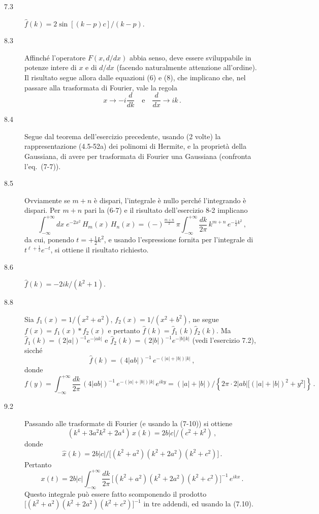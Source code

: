 \documentclass[11pt, a4paper]{book}
\numberwithin{equation}{section}
\begin{document}
\begin{description}
\item[7.3] $\hat{f}(k) = 2\sin[(k-p)c]/(k-p)$.

\item[8.3] Affinché l'operatore $F(x,d/dx)$ abbia senso, deve essere sviluppabile in potenze intere di $x$ e di $d/dx$ (facendo naturalmente attenzione all'ordine). Il risultato segue allora dalle equazioni (6) e (8), che implicano che, nel passare alla trasformata di Fourier, vale la regola
\[
  x\to -i\frac{d}{dk}\quad\text{e}\quad\frac{d}{dx}\to ik\,.
\]

\item[8.4] Segue dal teorema dell'esercizio precedente, usando (2 volte) la rappresentazione (4.5-52a) dei polinomi di Hermite, e la proprietà della Gaussiana, di avere per trasformata di Fourier una Gaussiana (confronta l'eq.\ (7-7)).

\item[8.5] Ovviamente se $m+n$ è dispari, l'integrale è nullo perché l'integrando è dispari. Per $m+n$ pari la (6-7) e il risultato dell'esercizio 8-2 implicano
\[
  \int_{-\infty}^{+\infty} dx\;e^{-2x^2}\,H_m(x)\,H_n(x)
  = (-)^{\frac{m+n}{2}}\,\pi\int_{-\infty}^{+\infty}\frac{dk}{2\pi}\,k^{m+n}\,e^{-\frac{1}{2}k^2}\,,
\]
da cui, ponendo $t=+\frac{1}{2}k^2$, e usando l'espressione fornita per l'integrale di $t^{\ell+\frac{1}{2}}e^{-t}$, si ottiene il risultato richiesto.

\item[8.6] $\hat{f}(k) = -2ik/(k^2+1)$.

\item[8.8] Sia $f_1(x)=1/(x^2+a^2)$, $f_2(x)=1/(x^2+b^2)$, ne segue $f(x)=f_1(x)*f_2(x)$ e pertanto $\hat{f}(k)=\hat{f}_1(k)\hat{f}_2(k)$. Ma $\hat{f}_1(k)=(2|a|)^{-1}e^{-|ak|}$ e $\hat{f}_2(k)=(2|b|)^{-1}e^{-|b||k|}$ (vedi l'esercizio 7.2), sicché
\[
  \hat{f}(k) = (4|ab|)^{-1}\,e^{-(|a|+|b|)|k|}\,,
\]
donde
\[
  f(y) = \int_{-\infty}^{+\infty}\frac{dk}{2\pi}\,(4|ab|)^{-1}\,e^{-(|a|+|b|)|k|}\,e^{iky}
  = (|a|+|b|)\Big/\left\{2\pi\cdot2|ab|\bigl[(|a|+|b|)^2+y^2\bigr]\right\}\,.
\]

\item[9.2] Passando alle trasformate di Fourier (e usando la (7-10))
si ottiene
\[
  (k^4+3a^2k^2+2a^4)\,\hat{x}(k) = 2b|c|/(c^2+k^2)\,,
\]
donde
\[
  \hat{x}(k) = 2b|c|\Big/\bigl[(k^2+a^2)(k^2+2a^2)(k^2+c^2)\bigr]\,.
\]
Pertanto
\[
  x(t) = 2b|c|\int_{-\infty}^{+\infty}\frac{dk}{2\pi}\,
  \bigl[(k^2+a^2)(k^2+2a^2)(k^2+c^2)\bigr]^{-1}\,e^{ikx}\,.
\]
Questo integrale può essere fatto scomponendo il prodotto $\bigl[(k^2+a^2)(k^2+2a^2)(k^2+c^2)\bigr]^{-1}$ in tre addendi, ed usando la (7.10).
\end{description}
\end{document}
